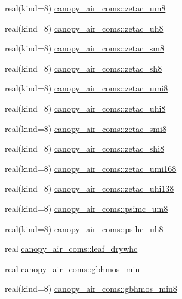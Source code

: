 \begin{DoxyCompactItemize}
\item 
real(kind=8) \hyperlink{namespacecanopy__air__coms_a0ca6faf34f131f616b83ef67fd4378f1}{canopy\+\_\+air\+\_\+coms\+::zetac\+\_\+um8}
\item 
real(kind=8) \hyperlink{namespacecanopy__air__coms_adbe00f7d7b35e9b9c8fd089a3f43af6e}{canopy\+\_\+air\+\_\+coms\+::zetac\+\_\+uh8}
\item 
real(kind=8) \hyperlink{namespacecanopy__air__coms_aa15239b3e11e62c0374d0baf2df69916}{canopy\+\_\+air\+\_\+coms\+::zetac\+\_\+sm8}
\item 
real(kind=8) \hyperlink{namespacecanopy__air__coms_a7c5b672ade9a63cbf576713da8f3b93c}{canopy\+\_\+air\+\_\+coms\+::zetac\+\_\+sh8}
\item 
real(kind=8) \hyperlink{namespacecanopy__air__coms_a0efff7cedb1c82920d87251dc41d2dbc}{canopy\+\_\+air\+\_\+coms\+::zetac\+\_\+umi8}
\item 
real(kind=8) \hyperlink{namespacecanopy__air__coms_ade38033808e0a14fe6c57c6c0bca3830}{canopy\+\_\+air\+\_\+coms\+::zetac\+\_\+uhi8}
\item 
real(kind=8) \hyperlink{namespacecanopy__air__coms_a926668c3d037ecfbb2d02ddb129f52b2}{canopy\+\_\+air\+\_\+coms\+::zetac\+\_\+smi8}
\item 
real(kind=8) \hyperlink{namespacecanopy__air__coms_a0ae69e97c7743ff690c6554c17acb8ec}{canopy\+\_\+air\+\_\+coms\+::zetac\+\_\+shi8}
\item 
real(kind=8) \hyperlink{namespacecanopy__air__coms_a9a1facba0961e590128989d12b63d4e9}{canopy\+\_\+air\+\_\+coms\+::zetac\+\_\+umi168}
\item 
real(kind=8) \hyperlink{namespacecanopy__air__coms_ae957bcd38952302b378ebffb27d0172b}{canopy\+\_\+air\+\_\+coms\+::zetac\+\_\+uhi138}
\item 
real(kind=8) \hyperlink{namespacecanopy__air__coms_a0c0c8fcefe0b43284cb9e1f33438460e}{canopy\+\_\+air\+\_\+coms\+::psimc\+\_\+um8}
\item 
real(kind=8) \hyperlink{namespacecanopy__air__coms_a31831f12ac9b9a0c6c50fd454999572d}{canopy\+\_\+air\+\_\+coms\+::psihc\+\_\+uh8}
\item 
real \hyperlink{namespacecanopy__air__coms_a325451bf2fb18b7f7ede855957b8a525}{canopy\+\_\+air\+\_\+coms\+::leaf\+\_\+drywhc}
\item 
real \hyperlink{namespacecanopy__air__coms_abe79d14b93c9428f34d88610142bc148}{canopy\+\_\+air\+\_\+coms\+::gbhmos\+\_\+min}
\item 
real(kind=8) \hyperlink{namespacecanopy__air__coms_af56b6b535e7f020cae8112c71a4f8a87}{canopy\+\_\+air\+\_\+coms\+::gbhmos\+\_\+min8}

\end{DoxyCompactItemize}
